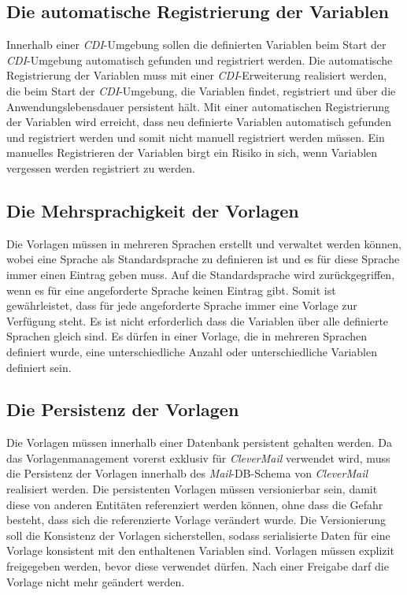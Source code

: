 \subsection{Die automatische Registrierung der Variablen}
Innerhalb einer \emph{CDI}-Umgebung sollen die definierten Variablen beim Start der \emph{CDI}-Umgebung automatisch gefunden und registriert werden. Die automatische Registrierung der Variablen muss mit einer \emph{CDI}-Erweiterung realisiert werden, die beim Start der \emph{CDI}-Umgebung, die Variablen findet, registriert und über die Anwendungslebensdauer persistent hält. Mit einer automatischen Registrierung der Variablen wird erreicht, dass neu definierte Variablen automatisch gefunden und registriert werden und somit nicht manuell registriert werden müssen. Ein manuelles Registrieren der Variablen birgt ein Risiko in sich, wenn Variablen vergessen werden registriert zu werden.

\subsection{Die Mehrsprachigkeit der Vorlagen}
Die Vorlagen müssen in mehreren Sprachen erstellt und verwaltet werden können, wobei eine Sprache als Standardsprache zu definieren ist und es für diese Sprache immer einen Eintrag geben muss. Auf die Standardsprache wird zurückgegriffen, wenn es für eine angeforderte Sprache keinen Eintrag gibt. Somit ist gewährleistet, dass für jede angeforderte Sprache immer eine Vorlage zur Verfügung steht. Es ist nicht erforderlich dass die Variablen über alle definierte Sprachen gleich sind. Es dürfen in einer Vorlage, die in mehreren Sprachen definiert wurde, eine unterschiedliche Anzahl oder unterschiedliche Variablen definiert sein.

\subsection{Die Persistenz der Vorlagen}
\label{sec:sub-template-variable-persistenz}
Die Vorlagen müssen innerhalb einer Datenbank persistent gehalten werden. Da das Vorlagenmanagement vorerst exklusiv für \emph{CleverMail} verwendet wird, muss die Persistenz der Vorlagen innerhalb des \emph{Mail}-DB-Schema von \emph{CleverMail} realisiert werden. Die persistenten Vorlagen müssen versionierbar sein, damit diese von anderen Entitäten referenziert werden können, ohne dass die Gefahr besteht, dass sich die referenzierte Vorlage verändert wurde.    Die Versionierung soll die Konsistenz der Vorlagen sicherstellen, sodass serialisierte Daten für eine Vorlage konsistent mit den enthaltenen Variablen sind. Vorlagen müssen explizit freigegeben werden, bevor diese verwendet dürfen. Nach einer Freigabe darf die Vorlage nicht mehr geändert werden.

